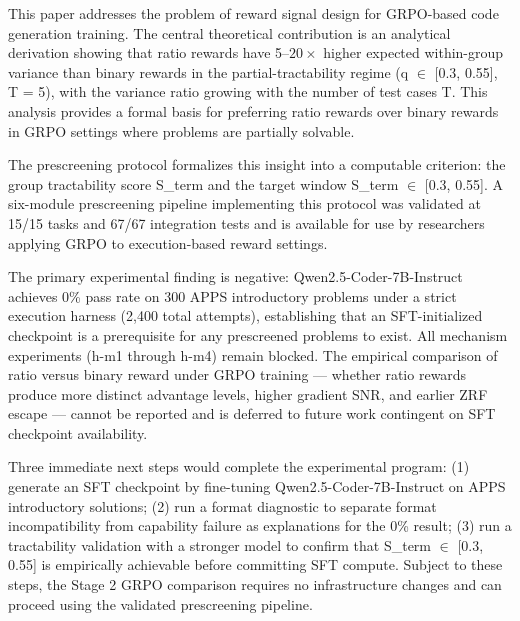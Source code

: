
This paper addresses the problem of reward signal design for GRPO-based code generation training. The central theoretical contribution is an analytical derivation showing that ratio rewards have 5--$20\times$ higher expected within-group variance than binary rewards in the partial-tractability regime (q $\in$ [0.3, 0.55], T = 5), with the variance ratio growing with the number of test cases T. This analysis provides a formal basis for preferring ratio rewards over binary rewards in GRPO settings where problems are partially solvable.

The prescreening protocol formalizes this insight into a computable criterion: the group tractability score S\_term and the target window S\_term $\in$ [0.3, 0.55]. A six-module prescreening pipeline implementing this protocol was validated at 15/15 tasks and 67/67 integration tests and is available for use by researchers applying GRPO to execution-based reward settings.

The primary experimental finding is negative: Qwen2.5-Coder-7B-Instruct achieves 0\% pass rate on 300 APPS introductory problems under a strict execution harness (2,400 total attempts), establishing that an SFT-initialized checkpoint is a prerequisite for any prescreened problems to exist. All mechanism experiments (h-m1 through h-m4) remain blocked. The empirical comparison of ratio versus binary reward under GRPO training --- whether ratio rewards produce more distinct advantage levels, higher gradient SNR, and earlier ZRF escape --- cannot be reported and is deferred to future work contingent on SFT checkpoint availability.

Three immediate next steps would complete the experimental program: (1) generate an SFT checkpoint by fine-tuning Qwen2.5-Coder-7B-Instruct on APPS introductory solutions; (2) run a format diagnostic to separate format incompatibility from capability failure as explanations for the 0\% result; (3) run a tractability validation with a stronger model to confirm that S\_term $\in$ [0.3, 0.55] is empirically achievable before committing SFT compute. Subject to these steps, the Stage 2 GRPO comparison requires no infrastructure changes and can proceed using the validated prescreening pipeline.

